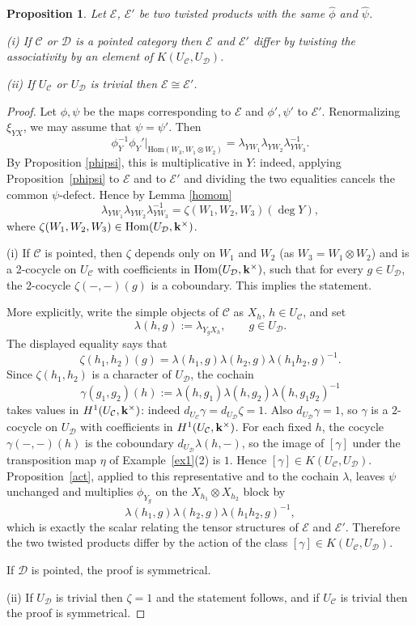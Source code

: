 \documentclass[12pt]{amsart}
\numberwithin{equation}{section}
\newtheorem{proposition}[theorem]{Proposition}
\theoremstyle{definition}
\newcommand{\Hom}{\text{Hom}}
\newcommand{\1}{_{(1)}}
\newcommand{\2}{_{(2)}}
\newcommand{\3}{_{(3)}}
\newcommand{\4}{_{(4)}}
\newcommand{\5}{_{(5)}}
\newcommand{\6}{_{(6)}}
\newcommand{\C}{\mathcal{C}}
\theoremstyle{plain}
\theoremstyle{definition}
\theoremstyle{remark}
\def\C{\mathcal{C}}
\def\D{\mathcal{D}}
\def\E{\mathcal{E}}
\def\Hom{\mathrm{Hom}}
\begin{document}
\begin{proposition}\label{equii} Let $\E$, $\E'$ be two twisted products with the same $\widehat{\phi}$ and $\widehat{\psi}$. 

(i) If $\C$ or $\D$ is a pointed category then $\E$ and $\E'$ differ by twisting the associativity by an element of $K(U_\C,U_\D)$.

(ii)  If $U_\C$ or $U_\D$ is trivial then $\E\cong \E'$. 
\end{proposition} 

\begin{proof} Let $\phi,\psi$ be the maps corresponding to $\E$ and $\phi',\psi'$ to $\E'$. 
Renormalizing $\xi_{YX}$, we may assume that $\psi=\psi'$. 
Then 
$$
\phi_Y^{-1}\phi_Y'|_{\Hom(W_3,W_1\otimes W_2)}=\lambda_{YW_1}\lambda_{YW_2}\lambda_{YW_3}^{-1}. 
$$
By Proposition \ref{phipsi}, this is multiplicative in $Y$: indeed, applying Proposition~\ref{phipsi} to $\E$ and to $\E'$ and dividing the two equalities cancels the common $\psi$-defect.  Hence by Lemma \ref{homom} 
$$
\lambda_{YW_1}\lambda_{YW_2}\lambda_{YW_3}^{-1}=\zeta(W_1,W_2,W_3)(\deg Y), 
$$
where $\zeta(W_1,W_2,W_3)\in \Hom(U_\D,\bold k^\times)$. 

(i) If $\C$ is pointed, then 
$\zeta$ depends only on $W_1$ and $W_2$ (as $W_3=W_1\otimes W_2$) and is a 2-cocycle on $U_\C$ with coefficients in $\Hom(U_\D,\bold k^\times)$, 
such that for every $g\in U_\D$, the 2-cocycle $\zeta(-,-)(g)$ is a coboundary.
 This implies the statement.

More explicitly, write the simple objects of $\C$ as $X_h$, $h\in U_\C$, and set
\[
        \lambda(h,g):=\lambda_{Y_gX_h},\qquad g\in U_\D.
\]
The displayed equality says that
\[
        \zeta(h_1,h_2)(g)
        =\lambda(h_1,g)\lambda(h_2,g)\lambda(h_1h_2,g)^{-1}.
\]
Since $\zeta(h_1,h_2)$ is a character of $U_\D$, the cochain
\[
        \gamma(g_1,g_2)(h):=
        \lambda(h,g_1)\lambda(h,g_2)\lambda(h,g_1g_2)^{-1}
\]
takes values in $H^1(U_\C,\bold k^\times)$: indeed $d_{U_\C}\gamma=d_{U_\D}\zeta=1$.  Also $d_{U_\D}\gamma=1$, so $\gamma$ is a $2$-cocycle on $U_\D$ with coefficients in $H^1(U_\C,\bold k^\times)$.  For each fixed $h$, the cocycle $\gamma(-,-)(h)$ is the coboundary $d_{U_\D}\lambda(h,-)$, so the image of $[\gamma]$ under the transposition map $\eta$ of Example~\ref{ex1}(2) is $1$.  Hence $[\gamma]\in K(U_\C,U_\D)$.  Proposition~\ref{act}, applied to this representative and to the cochain $\lambda$, leaves $\psi$ unchanged and multiplies $\phi_{Y_g}$ on the $X_{h_1}\otimes X_{h_2}$ block by
\[
        \lambda(h_1,g)\lambda(h_2,g)\lambda(h_1h_2,g)^{-1},
\]
which is exactly the scalar relating the tensor structures of $\E$ and $\E'$.  Therefore the two twisted products differ by the action of the class $[\gamma]\in K(U_\C,U_\D)$.

 If $\D$ is pointed, the proof is symmetrical. 

(ii) If $U_\D$ is trivial then $\zeta=1$ and the statement follows, and if $U_\C$ is trivial then the proof is symmetrical.   
\end{proof} 
\end{document}
